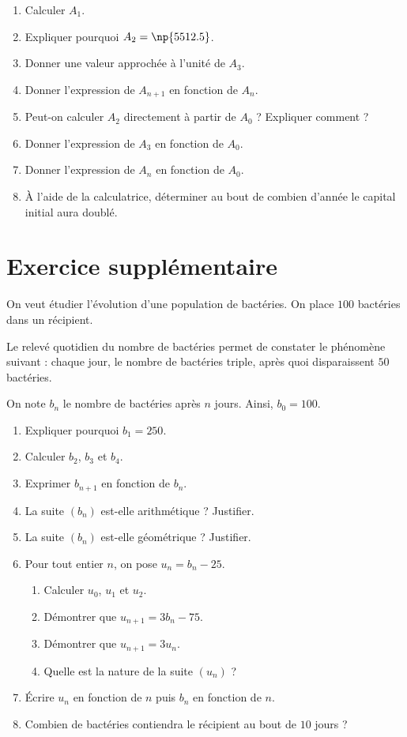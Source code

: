 \documentclass[10pt,openright,twoside,french]{book}
\begin{document}
{\begin{enumerate}
    \item Calculer $A_1$.
    \item Expliquer pourquoi $A_2 = \np{5512.5}$.
    \item Donner une valeur approchée à l'unité de $A_3$.
    \item Donner l'expression de $A_{n+1}$ en fonction de $A_n$.
    \item Peut-on calculer $A_2$ directement à partir de $A_0$ ? Expliquer comment ?
    \item Donner l'expression de $A_3$ en fonction de $A_0$.
    \item Donner l'expression de $A_n$ en fonction de $A_0$.
    \item À l'aide de la calculatrice, déterminer au bout de combien d'année le capital initial aura doublé.
\end{enumerate}

\section*{Exercice supplémentaire}
On veut étudier l'évolution d'une population de bactéries. On place $100$ bactéries dans un récipient.\par
Le relevé quotidien du nombre de bactéries permet de constater le phénomène suivant : chaque jour, le nombre de bactéries triple, après quoi disparaissent $50$ bactéries.\par
On note $b_n$ le nombre de bactéries après $n$ jours. Ainsi, $b_0 = 100$.

\begin{enumerate}
    \item Expliquer pourquoi $b_1 = 250$.
    \item Calculer $b_2$, $b_3$ et $b_4$.
    \item Exprimer $b_{n+1}$ en fonction de $b_n$.
    \item La suite $(b_n)$ est-elle arithmétique ? Justifier.
    \item La suite $(b_n)$ est-elle géométrique ? Justifier.
    \item Pour tout entier $n$, on pose $u_n = b_n - 25$.
    \begin{enumerate}
        \item Calculer $u_0$, $u_1$ et $u_2$.
        \item Démontrer que $u_{n+1} = 3b_n - 75$.
        \item Démontrer que $u_{n+1} = 3u_n$.
        \item Quelle est la nature de la suite $(u_n)$ ?
    \end{enumerate}
    \item \'Ecrire $u_n$ en fonction de $n$ puis $b_n$ en fonction de $n$.
    \item Combien de bactéries contiendra le récipient au bout de $10$ jours ?
\end{enumerate}
}
\end{document}
